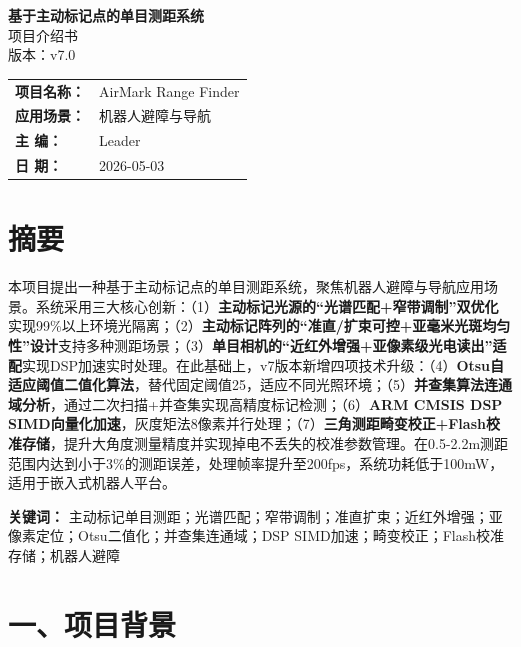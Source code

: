 \documentclass[12pt,a4paper]{article}
\begin{document}
\begin{titlepage}
\vspace*{2cm}
\begin{center}
{\fontsize{28pt}{\baselineskip}\selectfont\bfseries 基于主动标记点的单目测距系统}\\[1.5cm]
{\fontsize{18pt}{\baselineskip}\selectfont 项目介绍书}\\[0.5cm]
{\fontsize{14pt}{\baselineskip}\selectfont 版本：v7.0}\\[3cm]
\end{center}
\begin{tabular}{ll}
{\bfseries 项目名称：} & AirMark Range Finder \\[0.5cm]
{\bfseries 应用场景：} & 机器人避障与导航 \\[0.5cm]
{\bfseries 主    编：} & Leader \\[0.5cm]
{\bfseries 日    期：} & 2026-05-03 \\
\end{tabular}
\end{titlepage}
\thispagestyle{empty}
\newpage

\section*{摘要}
本项目提出一种基于主动标记点的单目测距系统，聚焦机器人避障与导航应用场景。系统采用三大核心创新：（1）\textbf{主动标记光源的``光谱匹配+窄带调制''双优化}实现99\%以上环境光隔离；（2）\textbf{主动标记阵列的``准直/扩束可控+亚毫米光斑均匀性''设计}支持多种测距场景；（3）\textbf{单目相机的``近红外增强+亚像素级光电读出''适配}实现DSP加速实时处理。在此基础上，v7版本新增四项技术升级：（4）\textbf{Otsu自适应阈值二值化算法}，替代固定阈值25，适应不同光照环境；（5）\textbf{并查集算法连通域分析}，通过二次扫描+并查集实现高精度标记检测；（6）\textbf{ARM CMSIS DSP SIMD向量化加速}，灰度矩法8像素并行处理；（7）\textbf{三角测距畸变校正+Flash校准存储}，提升大角度测量精度并实现掉电不丢失的校准参数管理。在0.5-2.2m测距范围内达到小于3\%的测距误差，处理帧率提升至200fps，系统功耗低于100mW，适用于嵌入式机器人平台。

\textbf{关键词：} 主动标记单目测距；光谱匹配；窄带调制；准直扩束；近红外增强；亚像素定位；Otsu二值化；并查集连通域；DSP SIMD加速；畸变校正；Flash校准存储；机器人避障

\newpage

\section{一、项目背景}
\end{document}
